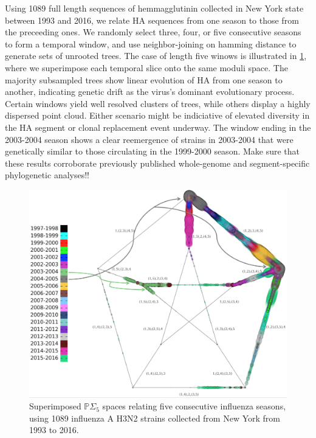\documentclass[a4paper,11pt]{article}
\begin{document}
Using 1089 full length sequences of hemmagglutinin collected in New York state between 1993 and 2016, we relate HA sequences from one season to those from the preceeding ones.
We randomly select three, four, or five consecutive seasons to form a temporal window, and use neighbor-joining on hamming distance to generate sets of unrooted trees.
The case of length five winows is illustrated in \ref{fig:flu_quint}, where we superimpose each temporal slice onto the same moduli space.
The majority subsampled trees show linear evolution of HA from one season to another, indicating genetic drift as the virus's dominant evolutionary process.
Certain windows yield well resolved clusters of trees, while others display a highly dispersed point cloud.
Either scenario might be indiciative of elevated diversity in the HA segment or clonal replacement event underway.
The window ending in the 2003-2004 season shows a clear reemergence of strains in 2003-2004 that were genetically similar to those circulating in the 1999-2000 season.
Make sure that these results corroborate previously published whole-genome and segment-specific phylogenetic analyses!!~\cite{holmes2005whole}

\begin{figure}
    \centering
    \includegraphics[width=6in]{../figures/influenza_quint.png}
    \caption{Superimposed $\mathbb{P}\Sigma_5$ spaces relating five consecutive influenza seasons, using 1089 influenza A H3N2 strains collected from New York from 1993 to 2016.}
    \label{fig:flu_quint}
\end{figure}
\end{document}
